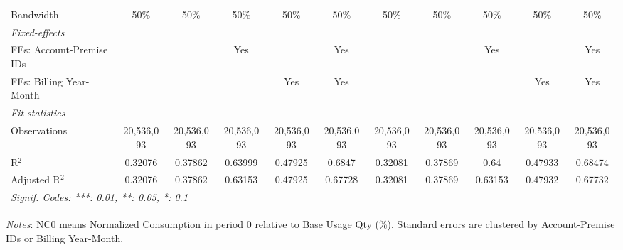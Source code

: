 \begin{table}[htbp]
\begin{adjustbox}{scale = 0.70}
\begin{tabular}{lcccccccccc}
& & & & & & & & & & \\
\midrule Bandwidth & 50\% & 50\% & 50\% & 50\% & 50\% & 50\% & 50\% & 50\% & 50\% & 50\%\\
\midrule
\emph{Fixed-effects}&   &   &   &   &   &   &   &   &   &  \\
FEs: Account-Premise IDs &  &  & Yes &  & Yes &  &  & Yes &  & Yes\\
FEs: Billing Year-Month &  &  &  & Yes & Yes &  &  &  & Yes & Yes\\
\midrule
\emph{Fit statistics}&  & & & & & & & & & \\
Observations & 20,536,093&20,536,093&20,536,093&20,536,093&20,536,093&20,536,093&20,536,093&20,536,093&20,536,093&20,536,093\\
R$^2$ & 0.32076&0.37862&0.63999&0.47925&0.6847&0.32081&0.37869&0.64&0.47933&0.68474\\
Adjusted R$^2$ & 0.32076&0.37862&0.63153&0.47925&0.67728&0.32081&0.37869&0.63153&0.47932&0.67732\\
\bottomrule\bottomrule
\multicolumn{11}{l}{\emph{Signif. Codes: ***: 0.01, **: 0.05, *: 0.1}}\\
\end{tabular}
\end{adjustbox}
\begin{tablenotes}
\footnotesize
\emph{\medskip Notes}: NC0 means Normalized Consumption in period 0 relative to Base Usage Qty (\%). Standard errors are clustered by Account-Premise IDs or Billing Year-Month.
\end{tablenotes}
\end{table}
